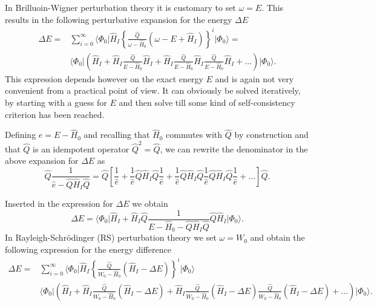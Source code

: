  In Brilluoin-Wigner perturbation theory \cite{shavittbartlett2009} it is customary to set
  $\omega=E$. This results in the following perturbative expansion for
  the energy $\Delta E$
  \begin{align}
  \Delta E=&\sum_{i=0}^{\infty}\langle \Phi_0\vert
  \hat{H}_I\left\{\frac{\hat{Q}}{\omega-\hat{H}_0}\left(\omega-E+\hat{H}_I\right)\right\}^i\vert
  \Phi_0\rangle=\\ &\langle \Phi_0\vert
  \left(\hat{H}_I+\hat{H}_I\frac{\hat{Q}}{E-\hat{H}_0}\hat{H}_I+
  \hat{H}_I\frac{\hat{Q}}{E-\hat{H}_0}\hat{H}_I\frac{\hat{Q}}{E-\hat{H}_0}\hat{H}_I+\dots\right)\vert
  \Phi_0\rangle.
  \end{align}
  This expression depends however on the exact energy $E$ and is again
  not very convenient from a practical point of view. It can obviously
  be solved iteratively, by starting with a guess for $E$ and then
  solve till some kind of self-consistency criterion has been reached.

  Defining $e=E-\hat{H}_0$ and recalling that $\hat{H}_0$ commutes
  with $\hat{Q}$ by construction and that $\hat{Q}$ is an idempotent
  operator $\hat{Q}^2=\hat{Q}$, we can rewrite the denominator in the above
  expansion for $\Delta E$ as
  \[
  \hat{Q}\frac{1}{\hat{e}-\hat{Q}\hat{H}_I\hat{Q}}=\hat{Q}\left[\frac{1}{\hat{e}}+\frac{1}{\hat{e}}\hat{Q}\hat{H}_I\hat{Q}
    \frac{1}{\hat{e}}+\frac{1}{\hat{e}}\hat{Q}\hat{H}_I\hat{Q}
    \frac{1}{\hat{e}}\hat{Q}\hat{H}_I\hat{Q}\frac{1}{\hat{e}}+\dots\right]\hat{Q}.
  \]

  Inserted in the expression for $\Delta E$ we obtain
  \[
  \Delta E= \langle \Phi_0\vert
  \hat{H}_I+\hat{H}_I\hat{Q}\frac{1}{E-\hat{H}_0-\hat{Q}\hat{H}_I\hat{Q}}\hat{Q}\hat{H}_I\vert
  \Phi_0\rangle.
  \]
  In Rayleigh-Schr\"odinger (RS) perturbation theory \cite{shavittbartlett2009} we set $\omega = W_0$ and obtain the
  following expression for the energy difference
  \begin{align}
  \Delta E =& \sum_{i=0}^{\infty}\langle \Phi_0\vert
  \hat{H}_I\left\{\frac{\hat{Q}}{W_0-\hat{H}_0}\left(\hat{H}_I-\Delta
  E\right)\right\}^i\vert \Phi_0\rangle\\ & \langle \Phi_0\vert
  \left(\hat{H}_I+\hat{H}_I\frac{\hat{Q}}{W_0-\hat{H}_0}(\hat{H}_I-\Delta
  E)+ \hat{H}_I\frac{\hat{Q}}{W_0-\hat{H}_0}(\hat{H}_I-\Delta
  E)\frac{\hat{Q}}{W_0-\hat{H}_0}(\hat{H}_I-\Delta
  E)+\dots\right)\vert \Phi_0\rangle.
  \end{align}




